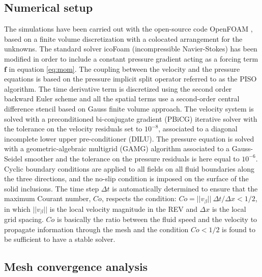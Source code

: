 
\subsection{Numerical setup}



The simulations have been carried out with the open-source code OpenFOAM \cite{openfoam}, based on  a finite volume discretization with a colocated arrangement for the unknowns.
The standard solver icoFoam (incompressible Navier-Stokes) has been modified in order to include a constant pressure gradient acting as a forcing term $\mathbf{f}$  in equation \eqref{eq:mom}. 
The coupling between  the velocity and the pressure equations is based on the pressure implicit split operator referred to as the PISO algorithm. 
The time derivative term is discretized using the second order backward Euler scheme and all the spatial terms use a second-order central difference stencil  based on Gauss finite volume approach. The velocity system is solved with a preconditioned bi-conjugate gradient (PBiCG) iterative solver with the tolerance on the velocity residuals set to $10^{-8}$, associated to a   diagonal incomplete lower upper pre-conditioner (DILU).
The pressure equation is solved with a  geometric-algebraic multigrid  (GAMG) algorithm associated to a Gauss-Seidel smoother and the tolerance on the pressure residuals is here equal to $10^{-6}$.  Cyclic boundary conditions are applied to all fields on all fluid
boundaries along the three directions, and the no-slip condition is imposed on the surface of the solid inclusions. 
The time step $\Delta t$  is automatically determined to ensure  that the maximum Courant number, $Co$, respects the condition:
$Co =  ||v_\beta||  \ \Delta t / \Delta x < 1/2 $, in which $||v_\beta||$ is the local velocity magnitude in the REV and $\Delta x$ is the local grid spacing. $Co$ 
is basically the ratio between the fluid speed  and the velocity to propagate information through the mesh and the condition $Co < 1/2$ is found to be sufficient to have a stable solver.




\subsection{Mesh convergence analysis }



